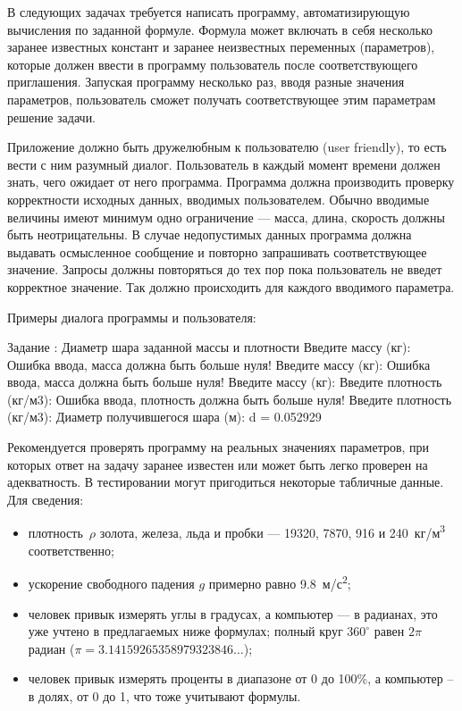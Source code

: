 
В следующих задачах требуется написать программу, автоматизирующую вычисления
по заданной формуле. Формула может включать в себя несколько заранее известных
констант и заранее неизвестных переменных (параметров), которые должен ввести
в программу пользователь после соответствующего приглашения. Запуская
программу несколько раз, вводя разные значения параметров, пользователь сможет
получать соответствующее этим параметрам решение задачи.

Приложение должно быть дружелюбным к пользователю (user friendly), то есть
вести с ним разумный диалог. Пользователь в каждый момент времени должен
знать, чего ожидает от него программа. Программа должна производить проверку
корректности исходных данных, вводимых пользователем.
Обычно вводимые величины имеют минимум одно ограничение --- масса, длина,
скорость должны быть неотрицательны.
В случае недопустимых данных программа должна выдавать осмысленное сообщение
и повторно запрашивать соответствующее значение. Запросы должны повторяться
до тех пор пока пользователь не введет корректное значение. Так должно происходить
для каждого вводимого параметра.

Примеры диалога программы и пользователя:

\begin{zzoutput}
  Задание : Диаметр шара заданной массы и плотности
  Введите массу (кг): 
  Ошибка ввода, масса должна быть больше нуля!
  Введите массу (кг): 
  Ошибка ввода, масса должна быть больше нуля!
  Введите массу (кг): 
  Введите плотность (кг/м3): 
  Ошибка ввода, плотность должна быть больше нуля!
  Введите плотность (кг/м3): 
  Диаметр получившегося шара (м): d = 0.052929
\end{zzoutput}
 
Рекомендуется проверять программу на реальных значениях параметров, при
которых ответ на задачу заранее известен или может быть легко проверен на
адекватность. В тестировании могут пригодиться некоторые табличные данные.
Для сведения:
%
\begin{itemize}
%
\item плотность~$\rho$ золота, железа, льда и пробки ---
19320, 7870, 916 и 240~кг/м\textsuperscript{3} соответственно;
%
\item ускорение свободного падения $g$ примерно равно 
9.8~м/с\textsuperscript{2};
%
\item человек привык измерять углы в градусах, а компьютер ---
в радианах, это уже учтено в предлагаемых ниже формулах;
полный круг $360^{\circ}$ равен $2\pi$ радиан ($\pi = 3.14159265358979323846\dots$);
%
\item человек привык измерять проценты в диапазоне от 0 до 100\%,
а компьютер -- в долях, от 0 до 1, что тоже учитывают формулы.
\end{itemize}


